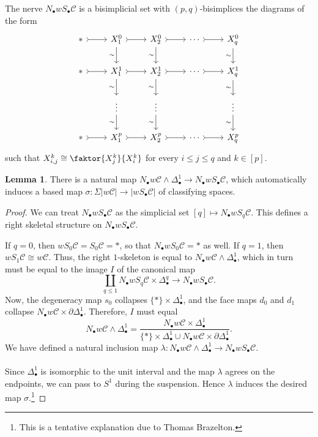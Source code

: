 \documentclass[10pt,letterpaper,cm]{nupset}
\theoremstyle{definition}
\theoremstyle{theorem}
\newtheorem{lemma}[definition]{Lemma}
\theoremstyle{remark}
\newcommand{\1}{\mathbf{1}}
\renewcommand{\c}{\mathscr{C}}
\newcommand{\0}{\vec 0}
\begin{document}
The nerve $N_{\bullet}w S_{\bullet}\c$ is a bisimplicial set with $(p,q)$-bisimplices the diagrams of the form
\[
\begin{tikzcd}
\ast \arrow[r, tail] & X_1^0 \arrow[d, "\sim"'] \arrow[r, tail] & X_2^0 \arrow[r, tail] \arrow[d, "\sim"'] & \cdots \arrow[r, tail] & X_q^0 \arrow[d, "\sim"'] \\
\ast \arrow[r, tail] & X_1^1 \arrow[d, "\sim"'] \arrow[r, tail] & X_2^1 \arrow[r, tail] \arrow[d, "\sim"'] & \cdots \arrow[r, tail] & X_q^1 \arrow[d, "\sim"'] \\
 & \vdots \arrow[d, "\sim"'] & \vdots \arrow[d, "\sim"'] &  & \vdots \arrow[d, "\sim"'] \\
\ast \arrow[r, tail] & X_1^p \arrow[r, tail] & X_2^p \arrow[r, tail] & \cdots \arrow[r, tail] & X_q^p
\end{tikzcd}
\]
such that $X^k_{i,j} \cong \faktor{X_j^k}{X_i^k}$ for every $i\leq j\leq q$ and $k\in [p]$. 


\begin{lemma}
There is a natural map $N_{\bullet} w{\c} \land \Delta_{\bullet}^1 \to N_{\bullet} w S_{\bullet} \c$, which automatically induces a based map $\sigma : \Sigma \left\lvert{w{\c}}\right\rvert\to \left\lvert{w S_{\bullet} \c}\right\rvert$ of classifying spaces.
\end{lemma}
\begin{proof}
We can treat $N_{\bullet} w S_{\bullet} \c$ as the simplicial set $[q] \mapsto N_{\bullet} w S_q \c$. This defines a right skeletal structure on $N_{\bullet} w S_{\bullet} \c$. 

\medskip

 If $q = 0$, then $w S_0 \c = S_0 \c = \ast$, so that $N_{\bullet} w S_0\c = \ast$ as well. If $q= 1$, then
$w S_1 \c \cong w{\c}$. Thus, the right $1$-skeleton is equal to $N_{\bullet} w{\c}  \land \Delta_{\bullet}^1$, which in turn must be equal to the image $I$ of the canonical map $$\coprod_{q\leq 1} N_{\bullet} w S_q \c \times \Delta_{\bullet}^q \to N_{\bullet} w S_{\bullet} \c.$$ Now, the degeneracy map $s_0$ collapses $\{\ast\} \times \Delta_{\bullet}^1$, and the face maps $d_0$ and $d_1$ collapse $ N_{\bullet} w{\c} \times \partial{\Delta_{\bullet}^1}$. 
Therefore, $I$ must equal $$N_{\bullet} w{\c}  \land \Delta_{\bullet}^1  = \frac{N_{\bullet} w{\c} \times \Delta_{\bullet}^1}{\{\ast\} \times \Delta_{\bullet}^1 \cup N_{\bullet} w{\c} \times \partial{\Delta_{\bullet}^1}}.$$  We have defined a natural inclusion map $\lambda : N_{\bullet} w{\c} \land \Delta_{\bullet}^1 \to  N_{\bullet} w S_{\bullet} \c$.
\\  \\ Since $\Delta_{\bullet}^1$ is isomorphic to the unit interval and the map $\lambda$ agrees on the endpoints, we can pass to $S^1$ during the suspension. Hence $\lambda$  induces the desired map $\sigma$.\footnote{This is a tentative explanation due to Thomas Brazelton.}
\end{proof}
\end{document}
